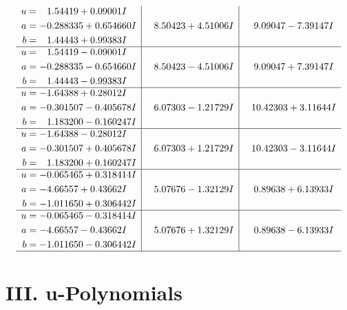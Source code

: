 \documentclass[1p]{elsarticle_modified}
\theoremstyle{definition}
\begin{document}
$$\begin{array}{c|c|c}
\begin{aligned}
u &= \phantom{-}1.54419 + 0.09001 I \\
a &= -0.288335 + 0.654660 I \\
b &= \phantom{-}1.44443 + 0.99383 I\end{aligned}
 & \phantom{-}8.50423 + 4.51006 I & \phantom{-}9.09047 - 7.39147 I \\ \hline\begin{aligned}
u &= \phantom{-}1.54419 - 0.09001 I \\
a &= -0.288335 - 0.654660 I \\
b &= \phantom{-}1.44443 - 0.99383 I\end{aligned}
 & \phantom{-}8.50423 - 4.51006 I & \phantom{-}9.09047 + 7.39147 I \\ \hline\begin{aligned}
u &= -1.64388 + 0.28012 I \\
a &= -0.301507 - 0.405678 I \\
b &= \phantom{-}1.183200 - 0.160247 I\end{aligned}
 & \phantom{-}6.07303 - 1.21729 I & \phantom{-}10.42303 + 3.11644 I \\ \hline\begin{aligned}
u &= -1.64388 - 0.28012 I \\
a &= -0.301507 + 0.405678 I \\
b &= \phantom{-}1.183200 + 0.160247 I\end{aligned}
 & \phantom{-}6.07303 + 1.21729 I & \phantom{-}10.42303 - 3.11644 I \\ \hline\begin{aligned}
u &= -0.065465 + 0.318414 I \\
a &= -4.66557 + 0.43662 I \\
b &= -1.011650 + 0.306442 I\end{aligned}
 & \phantom{-}5.07676 - 1.32129 I & \phantom{-}0.89638 + 6.13933 I \\ \hline\begin{aligned}
u &= -0.065465 - 0.318414 I \\
a &= -4.66557 - 0.43662 I \\
b &= -1.011650 - 0.306442 I\end{aligned}
 & \phantom{-}5.07676 + 1.32129 I & \phantom{-}0.89638 - 6.13933 I\\
 \hline 
 \end{array}$$\newpage
\newpage\renewcommand{\arraystretch}{1}
\centering \section*{ III. u-Polynomials}
\end{document}
